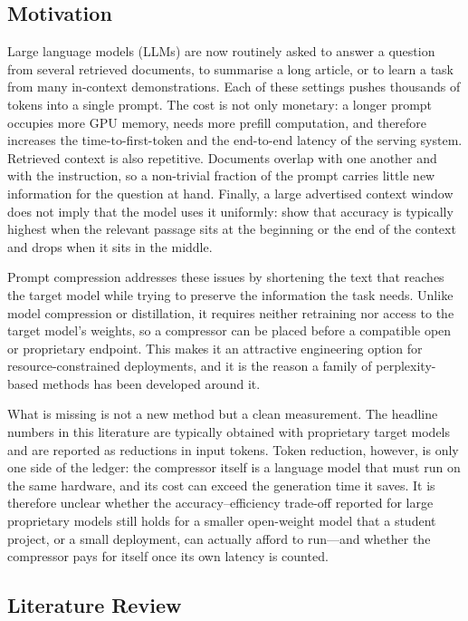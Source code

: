 \documentclass[10pt,a4paper,twocolumn]{article}
\begin{document}
\subsection{Motivation}

Large language models (LLMs) are now routinely asked to answer a question from
several retrieved documents, to summarise a long article, or to learn a task from
many in-context demonstrations. Each of these settings pushes thousands of tokens
into a single prompt. The cost is not only monetary: a longer prompt occupies more
GPU memory, needs more prefill computation, and therefore increases the
time-to-first-token and the end-to-end latency of the serving system. Retrieved
context is also repetitive. Documents overlap with one another and with the
instruction, so a non-trivial fraction of the prompt carries little new
information for the question at hand. Finally, a large advertised context window
does not imply that the model uses it uniformly: \citet{liu-etal-2024-lost} show
that accuracy is typically highest when the relevant passage sits at the
beginning or the end of the context and drops when it sits in the middle.

Prompt compression addresses these issues by shortening the text that reaches the
target model while trying to preserve the information the task needs. Unlike
model compression or distillation, it requires neither retraining nor access to
the target model's weights, so a compressor can be placed before a compatible open or proprietary endpoint. This makes it an attractive engineering option for
resource-constrained deployments, and it is the reason a family of
perplexity-based methods has been developed around it.

What is missing is not a new method but a clean measurement. The headline numbers
in this literature are typically obtained with proprietary target models and are
reported as reductions in input tokens. Token reduction, however, is only one side
of the ledger: the compressor itself is a language model that must run on the same
hardware, and its cost can exceed the generation time it saves. It is therefore
unclear whether the accuracy--efficiency trade-off reported for large proprietary
models still holds for a smaller open-weight model that a student project, or a
small deployment, can actually afford to run---and whether the compressor pays for
itself once its own latency is counted.

\subsection{Literature Review}
\end{document}
